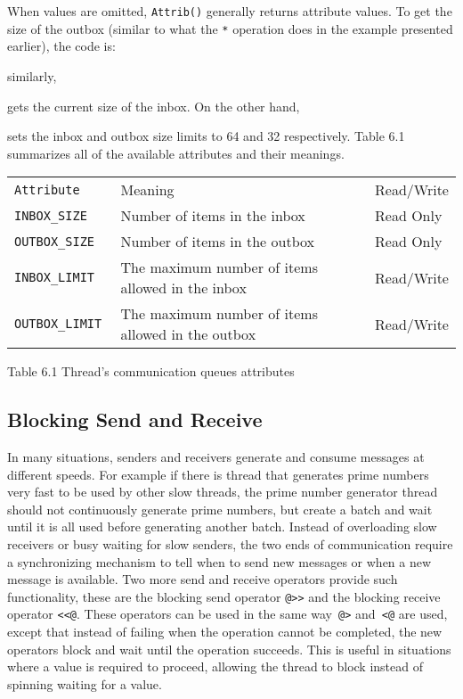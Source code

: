 
\noindent
When values are omitted, \texttt{Attrib()} generally returns attribute values.
To get the size of the outbox (similar to what the \texttt{*} operation does in the example
presented earlier), the code is:


\noindent similarly, 


\noindent gets the current size  of the inbox. On the other hand, 


\noindent sets the inbox and outbox size limits to 64 and 32
respectively. Table 6.1 summarizes all of the available attributes and
their meanings.

\begin{tabular}{>{\texttt\bgroup}l<{\egroup}ll}
{{\textnormal{Attribute}}} & Meaning & Read/Write\\
INBOX\_SIZE   & Number of items in the inbox & Read Only\\
OUTBOX\_SIZE  & Number of items in the outbox& Read Only\\
INBOX\_LIMIT  & The maximum number of items allowed in the inbox & Read/Write\\
OUTBOX\_LIMIT & The maximum number of items allowed in the outbox & Read/Write\\
\end{tabular}

{\color{red} Table 6.1} Thread's communication queues attributes

\subsection{Blocking Send and Receive}
In many situations, senders and receivers generate and consume messages at
different speeds. For example if there is thread that generates prime
numbers very fast to be used by other slow threads, the prime number
generator thread should not continuously generate prime numbers, but create
a batch and wait until it is all used before generating another
batch. Instead of overloading slow receivers or busy waiting for slow
senders, the two ends of communication require a synchronizing mechanism to
tell when to send new messages or when a new message is available. Two more
send and receive operators provide such functionality, these are the
blocking send operator \texttt{@>{}>} and the blocking receive operator
\texttt{<{}<@}. These operators can be used in the same way\texttt{ @>}
and\texttt{ <@} are used, except that instead of failing when the operation
cannot be completed, the new operators block and wait until the operation
succeeds. This is useful in situations where a value is required to
proceed, allowing the thread to block instead of spinning waiting for a
value.

